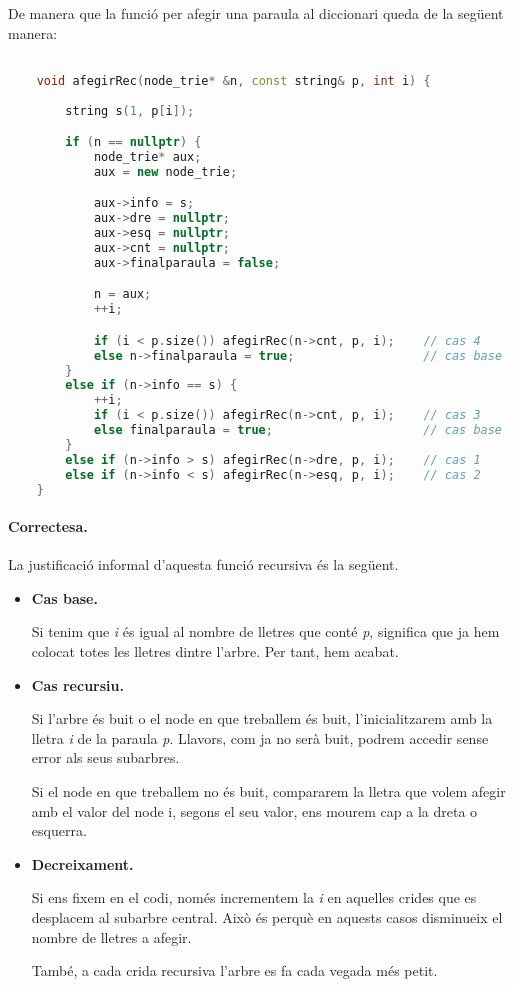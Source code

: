 \documentclass[titlepage]{article}
\begin{document}
De manera que la funció per afegir una paraula al diccionari queda de la següent manera:

\begin{lstlisting}[language=C++]

    void afegirRec(node_trie* &n, const string& p, int i) {
    
        string s(1, p[i]);

        if (n == nullptr) {
            node_trie* aux;
            aux = new node_trie;

            aux->info = s;
            aux->dre = nullptr;
            aux->esq = nullptr;
            aux->cnt = nullptr;
            aux->finalparaula = false;

            n = aux;
            ++i;

            if (i < p.size()) afegirRec(n->cnt, p, i);    // cas 4
            else n->finalparaula = true;                  // cas base
        }
        else if (n->info == s) {
            ++i;
            if (i < p.size()) afegirRec(n->cnt, p, i);    // cas 3
            else finalparaula = true;                     // cas base
        }
        else if (n->info > s) afegirRec(n->dre, p, i);    // cas 1
        else if (n->info < s) afegirRec(n->esq, p, i);    // cas 2
    }

\end{lstlisting}
\clearpage
\paragraph{Correctesa.} La justificació informal d'aquesta funció recursiva és la següent.
\begin{itemize}
    \item \textbf{Cas base.} \par
    Si tenim que \textit{i} és igual al nombre de lletres que conté \textit{p}, significa que ja hem colocat totes les lletres dintre l'arbre. Per tant, hem acabat.
    \item \textbf{Cas recursiu.}\par
    Si l'arbre és buit o el node en que treballem és buit, l'inicialitzarem amb la lletra \textit{i} de la paraula \textit{p}. Llavors, com ja no serà buit, podrem accedir sense error als seus subarbres. \par
    Si el node en que treballem no és buit, compararem la lletra que volem afegir amb el valor del node i, segons el seu valor, ens mourem cap a la dreta o esquerra.
    \item \textbf{Decreixament.}\par
    Si ens fixem en el codi, només incrementem la \textit{i} en aquelles crides que es desplacem al subarbre central. Això és perquè en aquests casos disminueix el nombre de lletres a afegir.\par
    També, a cada crida recursiva l'arbre es fa cada vegada més petit.
\end{itemize}
\end{document}
